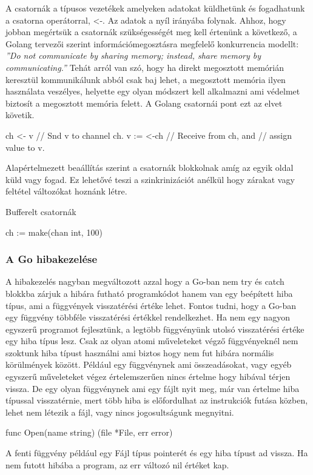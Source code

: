 A csatornák a típusos vezetékek amelyeken adatokat küldhetünk és fogadhatunk a csatorna operátorral, <-.
Az adatok a nyíl irányába folynak. Ahhoz, hogy jobban megértsük a csatornák szükségességét meg kell értenünk a következő, a Golang tervezői szerint információmegosztásra megfelelő konkurrencia modellt:
\emph{''Do not communicate by sharing memory; instead, share memory by communicating.''}
Tehát arról van szó, hogy ha direkt megosztott memórián keresztül kommunikálunk abból csak baj lehet, a megosztott memória ilyen használata veszélyes, helyette egy olyan módszert
kell alkalmazni ami védelmet biztosít a megosztott memória felett. A Golang csatornái pont ezt az elvet követik.
\begin{python}
    ch <- v    // Snd v to channel ch.
    v := <-ch  // Receive from ch, and
    // assign value to v.
\end{python}
Alapértelmezett beaállítás szerint a csatornák blokkolnak amíg az egyik oldal küld vagy fogad.
Ez lehetővé teszi a szinkrinizációt anélkül hogy zárakat vagy feltétel változókat hoznánk létre.

Bufferelt csatornák
\begin{python}
    ch := make(chan int, 100)
\end{python}


\subsubsection{A Go hibakezelése}
A hibakezelés nagyban megváltozott azzal hogy a Go-ban nem try és catch blokkba zárjuk a hibára futható programkódot
hanem van egy beépített hiba típus, ami a függvények visszatérési értéke lehet. Fontos tudni, hogy a Go-ban egy függvény többféle
visszatérési értékkel rendelkezhet. Ha nem egy nagyon egyszerű programot fejlesztünk, a legtöbb függvényünk utolsó visszatérési értéke egy hiba típus lesz.
Csak az olyan atomi műveleteket végző függvényeknél nem szoktunk hiba típust használni ami biztos hogy nem fut hibára normális körülmények között.
Például egy függvénynek ami összeadásokat, vagy egyéb egyszerű műveleteket végez értelemszerűen nincs értelme hogy hibával térjen vissza.
De egy olyan függvénynek ami egy fájlt nyit meg, már van értelme hiba típussal visszatérnie, mert több hiba is előfordulhat az instrukciók futása közben, lehet nem létezik a fájl, vagy nincs jogosultságunk megnyitni.
\begin{python}
    func Open(name string) (file *File, err error)
\end{python}
A fenti függvény például egy Fájl típus pointerét és egy hiba típust ad vissza. Ha nem futott hibába a program, az err változó nil értéket kap.

